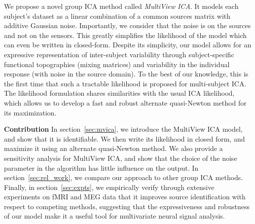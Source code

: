 We propose a novel group ICA method called \emph{MultiView ICA}.
%
It models each subject's dataset as a linear combination of a common
sources matrix with additive Gaussian noise.
%
Importantly, we consider that the noise is on the sources and not on
the sensors.
%
This greatly simplifies the likelihood of the model which can even be
written in closed-form.
%
Despite its simplicity, our model allows for an expressive representation of inter-subject variability through subject-specific functional topographies (mixing matrices) and variability in the individual response (with noise in the source domain).
%
%
To the best of our knowledge, this is the first time that such a tractable likelihood is proposed for multi-subject ICA.
%
The likelihood formulation shares similarities with the usual ICA likelihood, which allows us to develop a fast and robust alternate quasi-Newton method for its maximization.


\textbf{Contribution}
%
In section~\ref{sec:mvica}, we introduce the MultiView ICA model, and show that it is identifiable. We then write its likelihood in closed form, and maximize it using an alternate quasi-Newton method.
%
We also provide a sensitivity analysis for MultiView ICA, and show that the choice of the noise parameter in the algorithm has little influence on the output.
%
In section~\ref{sec:rel_work}, we compare our approach to other group ICA methods.
%
Finally, in section~\ref{sec:expts}, we empirically verify through extensive experiments on fMRI and MEG data that it improves source identification with respect to competing methods, suggesting that the expressiveness and robustness of our model make it a useful tool for multivariate neural signal analysis.




